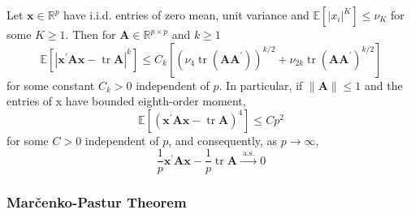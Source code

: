 \begin{lemma} \label{lem:quadratic-form-close-to-the-trace}
    Let $\mathbf{x} \in \mathbb{R}^{p}$ have i.i.d. entries of zero mean, unit variance and $\mathbb{E}\left[\left|x_{i}\right|^{K}\right] \leq \nu_{K}$ for some $K \geq 1 .$ Then for $\mathbf{A} \in \mathbb{R}^{p \times p}$ and $k \geq 1$
    $$
        \mathbb{E}\left[\left|\mathbf{x}^{\prime} \mathbf{A} \mathbf{x}-\operatorname{tr} \mathbf{A}\right|^{k}\right] \leq C_{k}\left[\left(\nu_{4} \operatorname{tr}\left(\mathbf{A} \mathbf{A}^{\prime}\right)\right)^{k / 2}+\nu_{2 k} \operatorname{tr}\left(\mathbf{A} \mathbf{A}^{\prime}\right)^{k / 2}\right]
    $$
    for some constant $C_{k}>0$ independent of $p .$ In particular, if $\|\mathbf{A}\| \leq 1$ and the entries of $\mathrm{x}$ have bounded eighth-order moment,
    $$
        \mathbb{E}\left[\left(\mathbf{x}^{\prime} \mathbf{A} \mathbf{x}-\operatorname{tr} \mathbf{A}\right)^{4}\right] \leq C p^{2}
    $$
    for some $C>0$ independent of $p$, and consequently, as $p \rightarrow \infty$,
    $$
        \frac{1}{p} \mathbf{x}^{\prime} \mathbf{A} \mathbf{x}-\frac{1}{p} \operatorname{tr} \mathbf{A} \stackrel{\text { a.s. }}{\longrightarrow} 0
    $$
\end{lemma}

\subsubsection{Marčenko-Pastur Theorem}

